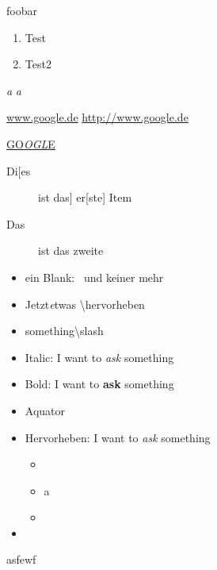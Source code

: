 foobar

\begin{enumerate}
\item Test
\item Test2
\end{enumerate}

 
\emph a
\emph{a}

\url{www.google.de}
\url{http://www.google.de}

\href{http://www.google.de}{GO\emph{OGL}E}

\begin{description}
\item[Di[es] ist das] er[ste] Item
\item[Das] ist das zweite
\end{description}

\begin{itemize}
    \item ein Blank: \ und keiner mehr
    \item Jetzt\emph etwas \textbackslash hervorheben
    \item something\textbackslash{}slash
    \item Italic: I want to \textit{ask} something
    \item Bold: I want to \textbf{ask} something
    \item Aquator
    \item Hervorheben: I want to \emph{ask} something
        \begin{itemize}
            \item\item a\item
        \end{itemize}
\item\end{itemize}

\begin{itemize}\end{itemize}
asfewf
